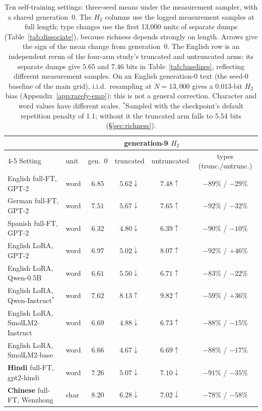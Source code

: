 \documentclass[10pt]{article}
\theoremstyle{plain}
\theoremstyle{definition}
\newcommand{\Htwo}{H_2}
\begin{document}
\begin{table}[t]
\centering\small
\caption{Ten self-training settings: three-seed means under the measurement sampler, with a
shared generation~0. The $\Htwo$ columns use the logged measurement samples at full length; type
changes use the first 13,000 units of separate dumps (Table~\ref{tab:dissociate}), because
richness depends strongly on length. Arrows give the sign of the mean change from generation~0. The English row is an independent
rerun of the four-arm study's truncated and untruncated arms; its separate dumps give $5.65$ and
$7.46$ bits in Table~\ref{tab:baselines}, reflecting different measurement samples.
On an English generation-0 text (the seed-0 baseline of the main grid), i.i.d.\ resampling at
$N=13{,}000$ gives a $0.013$-bit $\Htwo$ bias (Appendix~\ref{app:rarefy-emp}); this is not a
general correction. Character and word values have different scales. $^\ast$Sampled with the
checkpoint's default repetition penalty of 1.1; without it the truncated arm falls to $5.54$ bits
(\S\ref{sec:richness}).}
\label{tab:robust}
\begin{tabular}{llcccc}
\toprule
 & & & \multicolumn{2}{c}{generation-9 $\Htwo$} & \\
\cmidrule(lr){4-5}
Setting & unit & gen.~0 & truncated & untruncated & types (trunc./untrunc.) \\
\midrule
English full-FT, GPT-2 & word & $6.85$ & $5.62\downarrow$ & $7.48\uparrow$ & $-89\%$ / $-29\%$ \\
German full-FT, GPT-2 & word & $7.51$ & $5.67\downarrow$ & $7.65\uparrow$ & $-92\%$ / $-32\%$ \\
Spanish full-FT, GPT-2 & word & $6.32$ & $4.80\downarrow$ & $6.39\uparrow$ & $-90\%$ / $-10\%$ \\
English LoRA, GPT-2 & word & $6.97$ & $5.02\downarrow$ & $8.07\uparrow$ & $-92\%$ / $+46\%$ \\
English LoRA, Qwen-0.5B & word & $6.61$ & $5.50\downarrow$ & $6.71\uparrow$ & $-83\%$ / $-22\%$ \\
English LoRA, Qwen-Instruct$^\ast$ & word & $7.62$ & $8.13\uparrow$ & $9.82\uparrow$ & $-59\%$ / $+36\%$ \\
English LoRA, SmolLM2-Instruct & word & $6.69$ & $4.88\downarrow$ & $6.73\uparrow$ & $-88\%$ / $-15\%$ \\
English LoRA, SmolLM2-base & word & $6.66$ & $4.67\downarrow$ & $6.69\uparrow$ & $-88\%$ / $-17\%$ \\
\textbf{Hindi} full-FT, gpt2-hindi & word & $7.26$ & $5.07\downarrow$ & $7.10\downarrow$ & $-91\%$ / $-35\%$ \\
\textbf{Chinese} full-FT, Wenzhong & char & $8.20$ & $6.28\downarrow$ & $7.02\downarrow$ & $-78\%$ / $-58\%$ \\
\bottomrule
\end{tabular}
\end{table}
\end{document}

